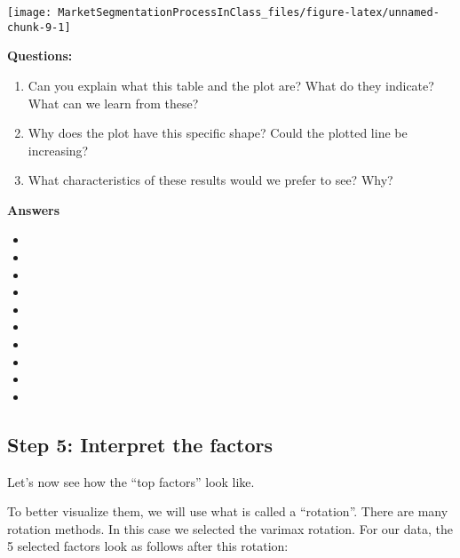 \documentclass[
]{article}
\providecommand{\tightlist}{%
  \setlength{\itemsep}{0pt}\setlength{\parskip}{0pt}}
\begin{document}
\begin{center}\texttt{[image: MarketSegmentationProcessInClass\_files/figure-latex/unnamed-chunk-9-1]} \end{center}

\textbf{Questions:}

\begin{enumerate}
\def\labelenumi{\arabic{enumi}.}
\tightlist
\item
  Can you explain what this table and the plot are? What do they
  indicate? What can we learn from these?
\item
  Why does the plot have this specific shape? Could the plotted line be
  increasing?
\item
  What characteristics of these results would we prefer to see? Why?
\end{enumerate}

\textbf{Answers}

\begin{itemize}
\tightlist
\item
\item
\item
\item
\item
\item
\item
\item
\item
\item
\end{itemize}

\hypertarget{step-5-interpret-the-factors}{%
\subsection{Step 5: Interpret the
factors}\label{step-5-interpret-the-factors}}

Let's now see how the ``top factors'' look like.

To better visualize them, we will use what is called a ``rotation''.
There are many rotation methods. In this case we selected the varimax
rotation. For our data, the 5 selected factors look as follows after
this rotation:
\end{document}
